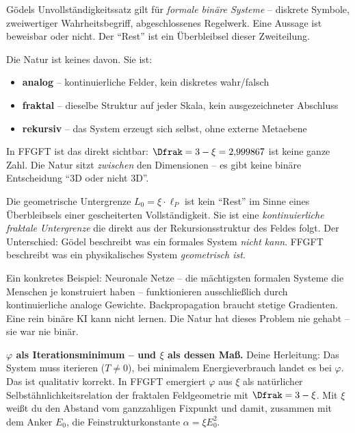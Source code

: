 \begin{response}
\medskip
\begin{warning}
Gödels Unvollständigkeitssatz gilt für \emph{formale binäre Systeme} -- diskrete Symbole, zweiwertiger Wahrheitsbegriff, abgeschlossenes Regelwerk. Eine Aussage ist beweisbar oder nicht. Der ``Rest'' ist ein Überbleibsel dieser Zweiteilung.

Die Natur ist keines davon. Sie ist:
\begin{itemize}[noitemsep]
  \item \textbf{analog} -- kontinuierliche Felder, kein diskretes wahr/falsch
  \item \textbf{fraktal} -- dieselbe Struktur auf jeder Skala, kein ausgezeichneter Abschluss
  \item \textbf{rekursiv} -- das System erzeugt sich selbst, ohne externe Metaebene
\end{itemize}

In FFGFT ist das direkt sichtbar: $\Dfrak = 3 - \xi = 2{,}999867$ ist keine ganze Zahl. Die Natur sitzt \emph{zwischen} den Dimensionen -- es gibt keine binäre Entscheidung ``3D oder nicht 3D''.

Die geometrische Untergrenze $L_0 = \xi \cdot \ell_P$ ist kein ``Rest'' im Sinne eines Überbleibsels einer gescheiterten Vollständigkeit. Sie ist eine \emph{kontinuierliche fraktale Untergrenze} die direkt aus der Rekursionsstruktur des Feldes folgt. Der Unterschied: Gödel beschreibt was ein formales System \emph{nicht kann}. FFGFT beschreibt was ein physikalisches System \emph{geometrisch ist}.

\medskip
Ein konkretes Beispiel: Neuronale Netze -- die mächtigsten formalen Systeme die Menschen je konstruiert haben -- funktionieren ausschließlich durch kontinuierliche analoge Gewichte. Backpropagation braucht stetige Gradienten. Eine rein binäre KI kann nicht lernen. Die Natur hat dieses Problem nie gehabt -- sie war nie binär.
\end{warning}

\medskip
\textbf{$\varphi$ als Iterationsminimum -- und $\xi$ als dessen Maß.}
Deine Herleitung: Das System muss iterieren ($T \neq 0$), bei minimalem Energieverbrauch landet es bei $\varphi$. Das ist qualitativ korrekt. In FFGFT emergiert $\varphi$ aus $\xi$ als natürlicher Selbstähnlichkeitsrelation der fraktalen Feldgeometrie mit $\Dfrak = 3 - \xi$. Mit $\xi$ weißt du den Abstand vom ganzzahligen Fixpunkt und damit, zusammen mit dem Anker $E_0$, die Feinstrukturkonstante $\alpha = \xi E_0^2$.


\end{response}
